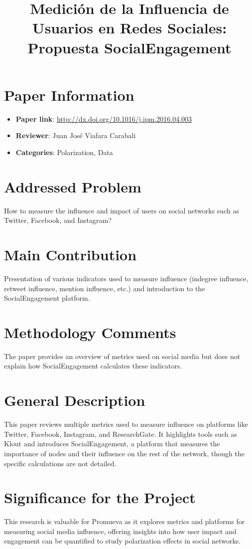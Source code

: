 \documentclass{article}
\title{Medición de la Influencia de Usuarios en Redes Sociales: Propuesta SocialEngagement}
\author{}
\date{}
\begin{document}
\maketitle

\section*{Paper Information}
\begin{itemize}
    \item \textbf{Paper link}: \url{http://dx.doi.org/10.1016/j.ipm.2016.04.003}
    \item \textbf{Reviewer}: Juan José Viafara Carabali
    \item \textbf{Categories}: Polarization, Data
\end{itemize}

\section*{Addressed Problem}
How to measure the influence and impact of users on social networks such as Twitter, Facebook, and Instagram?

\section*{Main Contribution}
Presentation of various indicators used to measure influence (indegree influence, retweet influence, mention influence, etc.) and introduction to the SocialEngagement platform.

\section*{Methodology Comments}
The paper provides an overview of metrics used on social media but does not explain how SocialEngagement calculates these indicators.

\section*{General Description}
This paper reviews multiple metrics used to measure influence on platforms like Twitter, Facebook, Instagram, and ResearchGate. It highlights tools such as Klout and introduces SocialEngagement, a platform that measures the importance of nodes and their influence on the rest of the network, though the specific calculations are not detailed.

\section*{Significance for the Project}
This research is valuable for Promueva as it explores metrics and platforms for measuring social media influence, offering insights into how user impact and engagement can be quantified to study polarization effects in social networks.
\end{document}
